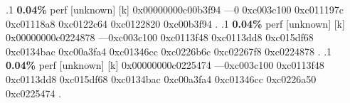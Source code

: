 \begin{profile}
{.1 \textbf{ 0.04\%} perf             [unknown]              [k] 0x00000000c00b3f94\newline {} ---0\newline {} 0xc003c100\newline {} 0xc011197c\newline {} 0xc01118a8\newline {} 0xc0122c64\newline {} 0xc0122820\newline {} 0xc00b3f94\newline {} . 
.1 \textbf{ 0.04\%} perf             [unknown]              [k] 0x00000000c0224878\newline {} ---0xc003c100\newline {} 0xc0113f48\newline {} 0xc0113dd8\newline {} 0xc015df68\newline {} 0xc0134bac\newline {} 0xc00a3fa4\newline {} 0xc01346cc\newline {} 0xc0226b6c\newline {} 0xc02267f8\newline {} 0xc0224878\newline {} . 
.1 \textbf{ 0.04\%} perf             [unknown]              [k] 0x00000000c0225474\newline {} ---0xc003c100\newline {} 0xc0113f48\newline {} 0xc0113dd8\newline {} 0xc015df68\newline {} 0xc0134bac\newline {} 0xc00a3fa4\newline {} 0xc01346cc\newline {} 0xc0226a50\newline {} 0xc0225474\newline {} . 
}
\end{profile}
